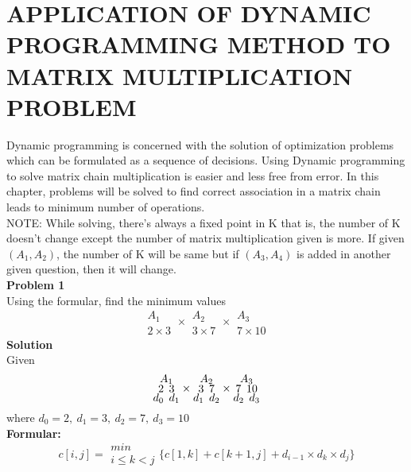 \documentclass[12pt]{report}
\begin{document}
\chapter{APPLICATION OF DYNAMIC PROGRAMMING METHOD TO MATRIX MULTIPLICATION PROBLEM}
Dynamic programming is concerned with the solution of optimization problems which can be formulated as a sequence of decisions. Using Dynamic programming to solve matrix chain multiplication is easier and less free from error. In this chapter, problems will be solved to find correct association in a matrix chain leads to minimum number of operations.\\
NOTE: While solving, there's always a fixed point in K that is, the number of K doesn't change except the number of matrix multiplication given is more. If given $(A_1,A_2)$, the number of K will be same but if $(A_3,A_4)$ is added in another given question, then it will change.\\
\textbf{Problem 1}\\
Using the formular, find the minimum values
$$\substack{A_1\\2\times 3}\times \substack{A_2\\3\times 7}\times \substack{A_3\\7\times 10}$$
\textbf{Solution} \\
Given
$$\Large\substack{A_1\\ {2 ~3}\\d_0 ~d_1} \times \substack{A_2\\ {3 ~7}\\d_1 ~d_2} \times \substack{A_3\\ {7 ~10}\\d_2 ~d_3} $$
where $d_0= 2,~ d_1=3, ~d_2=7, ~d_3=10$\\
\textbf{Formular:}
$$c[i,j] = \substack{min\\{i\le k < j}}\bigg\{ c[1,k] + c[k+1,j] + d_{i-1} \times d_k\times d_j\bigg\}$$
\end{document}
